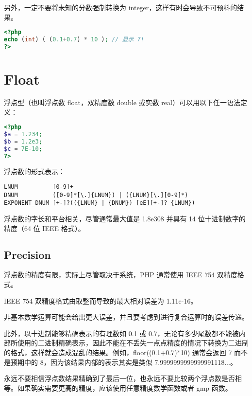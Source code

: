 另外，一定不要将未知的分数强制转换为 integer，这样有时会导致不可预料的结果。

\begin{lstlisting}[language=PHP]
<?php
echo (int) ( (0.1+0.7) * 10 ); // 显示 7!
?>
\end{lstlisting}

\section{Float}

浮点型（也叫浮点数 float，双精度数 double 或实数 real）可以用以下任一语法定义：

\begin{lstlisting}[language=PHP]
<?php
$a = 1.234; 
$b = 1.2e3; 
$c = 7E-10;
?>
\end{lstlisting}

浮点数的形式表示：

\begin{verbatim}
LNUM          [0-9]+
DNUM          ([0-9]*[\.]{LNUM}) | ({LNUM}[\.][0-9]*)
EXPONENT_DNUM [+-]?(({LNUM} | {DNUM}) [eE][+-]? {LNUM})
\end{verbatim}


浮点数的字长和平台相关，尽管通常最大值是 1.8e308 并具有 14 位十进制数字的精度（64 位 IEEE 格式）。


\subsection{Precision}


浮点数的精度有限，实际上尽管取决于系统，PHP 通常使用 IEEE 754 双精度格式。

\begin{compactitem}
\item IEEE 754 双精度格式由取整而导致的最大相对误差为 1.11e-16。
\item 非基本数学运算可能会给出更大误差，并且要考虑到进行复合运算时的误差传递。
\end{compactitem}


此外，以十进制能够精确表示的有理数如 0.1 或 0.7，无论有多少尾数都不能被内部所使用的二进制精确表示，因此不能在不丢失一点点精度的情况下转换为二进制的格式，这样就会造成混乱的结果。例如，floor((0.1+0.7)*10) 通常会返回 7 而不是预期中的 8，因为该结果内部的表示其实是类似 7.9999999999999991118...。

永远不要相信浮点数结果精确到了最后一位，也永远不要比较两个浮点数是否相等。如果确实需要更高的精度，应该使用任意精度数学函数或者 gmp 函数。

